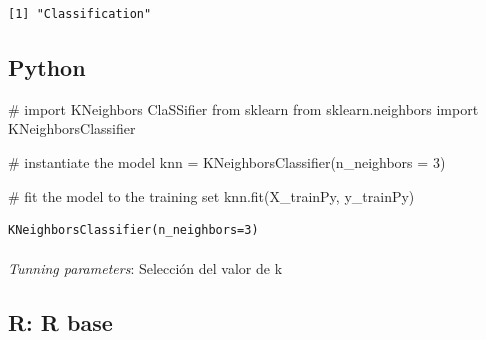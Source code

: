 \documentclass[
  letterpaper,
  DIV=11,
  numbers=noendperiod]{scrartcl}
\makeatletter
\let\oldparagraph\paragraph
\renewcommand{\paragraph}{
    \@ifstar
      \xxxParagraphStar
      \xxxParagraphNoStar
  }
\newcommand{\xxxParagraphStar}[1]{\oldparagraph*{#1}\mbox{}}
\newcommand{\xxxParagraphNoStar}[1]{\oldparagraph{#1}\mbox{}}
\newenvironment{Shaded}{\begin{snugshade}}{\end{snugshade}}
\newcommand{\CommentTok}[1]{\textcolor[rgb]{0.37,0.37,0.37}{#1}}
\newcommand{\DecValTok}[1]{\textcolor[rgb]{0.68,0.00,0.00}{#1}}
\newcommand{\ImportTok}[1]{\textcolor[rgb]{0.00,0.46,0.62}{#1}}
\newcommand{\NormalTok}[1]{\textcolor[rgb]{0.00,0.23,0.31}{#1}}
\newcommand{\OperatorTok}[1]{\textcolor[rgb]{0.37,0.37,0.37}{#1}}
\newcommand{\SpecialCharTok}[1]{\textcolor[rgb]{0.37,0.37,0.37}{#1}}
\makeatother
\begin{document}
\begin{Shaded}
\end{Shaded}

\begin{verbatim}
[1] "Classification"
\end{verbatim}

\subsection{Python}

\begin{Shaded}
\begin{Highlighting}[]
\CommentTok{\# import KNeighbors ClaSSifier from sklearn}
\ImportTok{from}\NormalTok{ sklearn.neighbors }\ImportTok{import}\NormalTok{ KNeighborsClassifier}

\CommentTok{\# instantiate the model}
\NormalTok{knn }\OperatorTok{=}\NormalTok{ KNeighborsClassifier(n\_neighbors }\OperatorTok{=} \DecValTok{3}\NormalTok{)}

\CommentTok{\# fit the model to the training set}
\NormalTok{knn.fit(X\_trainPy, y\_trainPy)}
\end{Highlighting}
\end{Shaded}

\begin{verbatim}
KNeighborsClassifier(n_neighbors=3)
\end{verbatim}

\paragraph{\texorpdfstring{\emph{Tunning parameters}: Selección del
valor de
k}{Tunning parameters: Selección del valor de k}}\label{tunning-parameters-selecciuxf3n-del-valor-de-k}

\subsection{R: R base}
\end{document}

